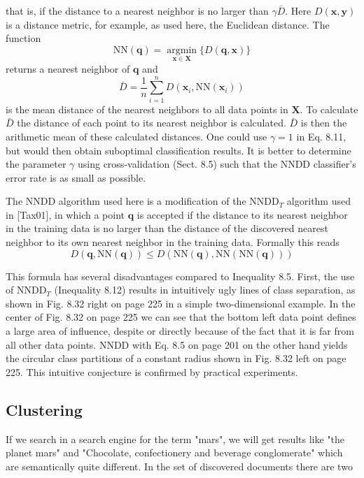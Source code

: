 \documentclass[10pt]{book}
\begin{document}
that is, if the distance to a nearest neighbor is no larger than $\gamma \bar{D}$. Here $D(\boldsymbol{x}, \boldsymbol{y})$ is a distance metric, for example, as used here, the Euclidean distance. The function
\[
\mathrm{NN}(\boldsymbol{q})=\underset{\boldsymbol{x} \in \boldsymbol{X}}{\operatorname{argmin}}\{D(\boldsymbol{q}, \boldsymbol{x})\}
\]
returns a nearest neighbor of $\boldsymbol{q}$ and
\[
\bar{D}=\frac{1}{n} \sum_{i=1}^{n} D\left(\boldsymbol{x}_{i}, \mathrm{NN}\left(\boldsymbol{x}_{i}\right)\right)
\]
is the mean distance of the nearest neighbors to all data points in $\boldsymbol{X}$. To calculate $\bar{D}$ the distance of each point to its nearest neighbor is calculated. $\bar{D}$ is then the arithmetic mean of these calculated distances. One could use $\gamma=1$ in Eq. 8.11, but would then obtain suboptimal classification results. It is better to determine the parameter $\gamma$ using cross-validation (Sect. 8.5) such that the NNDD classifier's error rate is as small as possible.

The NNDD algorithm used here is a modification of the $\mathrm{NNDD}_{T}$ algorithm used in [Tax01], in which a point $\boldsymbol{q}$ is accepted if the distance to its nearest neighbor in the training data is no larger than the distance of the discovered nearest neighbor to its own nearest neighbor in the training data. Formally this reads
\begin{equation*}
D(\boldsymbol{q}, \mathrm{NN}(\boldsymbol{q})) \leq D(\mathrm{NN}(\boldsymbol{q}), \mathrm{NN}(\mathrm{NN}(\boldsymbol{q}))) \tag{8.12}
\end{equation*}

This formula has several disadvantages compared to Inequality 8.5. First, the use of $\mathrm{NNDD}_{T}$ (Inequality 8.12) results in intuitively ugly lines of class separation, as shown in Fig. 8.32 right on page 225 in a simple two-dimensional example. In the center of Fig. 8.32 on page 225 we can see that the bottom left data point defines a large area of influence, despite or directly because of the fact that it is far from all other data points. NNDD with Eq. 8.5 on page 201 on the other hand yields the circular class partitions of a constant radius shown in Fig. 8.32 left on page 225. This intuitive conjecture is confirmed by practical experiments.

\subsection{Clustering}
If we search in a search engine for the term "mars", we will get results like "the planet mars" and "Chocolate, confectionery and beverage conglomerate" which are semantically quite different. In the set of discovered documents there are two
\end{document}
